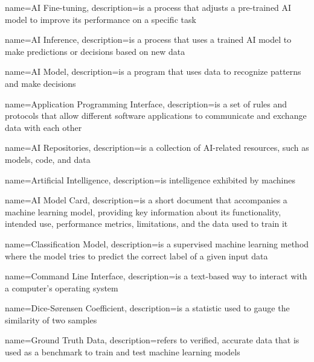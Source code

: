 
{
    name=AI Fine-tuning,
    description={is a process that adjusts a pre-trained AI model to improve
    its performance on a specific task}
}

{
    name=AI Inference,
    description={is a process that uses a trained AI model to make predictions
    or decisions based on new data}
}

{
    name=AI Model,
    description={is a program that uses data to recognize patterns and make
    decisions}
}

{
    name=Application Programming Interface,
    description={is a set of rules and protocols that allow different software
    applications to communicate and exchange data with each other}
}

{
    name=AI Repositories,
    description={is a collection of AI-related resources, such as models, code,
    and data}
}

{
    name=Artificial Intelligence,
    description={is intelligence exhibited by machines}
}

{
    name=AI Model Card,
    description={is a short document that accompanies a machine learning model,
    providing key information about its functionality, intended use,
    performance metrics, limitations, and the data used to train it}
}

{
    name=Classification Model,
    description={is a supervised machine learning method where the model tries
    to predict the correct label of a given input data}
}

{
    name=Command Line Interface,
    description={is a text-based way to interact with a computer's operating
    system}
}

{
    name=Dice-Sørensen Coefficient,
    description={is a statistic used to gauge the similarity of two samples}
}

{
    name=Ground Truth Data,
    description={refers to verified, accurate data that is used as a benchmark
    to train and test machine learning models}
}


